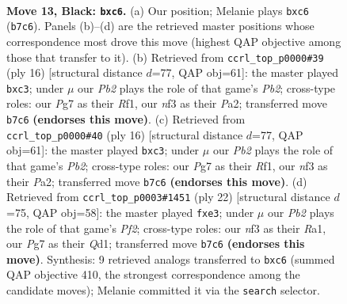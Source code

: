\documentclass[11pt]{article}
\begin{document}
\clearpage

\begin{figure}[p]\centering
\begin{subfigure}{0.46\textwidth}\centering
\resizebox{\linewidth}{!}{%
\newchessgame
\chessboard[
  setfen={r1bq1r2/bpp2ppk/2Bp1n1p/4p2P/P3P3/2PP1N2/5PP1/RNBQ1RK1 b - - 0 13},
  showmover=false,
  pgfstyle=straightmove, color=movearrow, markmove={b7-c6}
]}
\caption{}
\end{subfigure}\hfill
\begin{subfigure}{0.46\textwidth}\centering
\resizebox{\linewidth}{!}{%
\newchessgame
\chessboard[
  setfen={r1b1k2r/p1p1qppp/2pp1n2/4p3/4P3/2bP1N1P/PPP2PP1/R1BQ1RK1 w kq - 0 9},
  showmover=false,
  pgfstyle=straightmove, color=movearrow, markmove={b2-c3}
]}
\caption{}
\end{subfigure}
\\[4pt]
\begin{subfigure}{0.46\textwidth}\centering
\resizebox{\linewidth}{!}{%
\newchessgame
\chessboard[
  setfen={r1b1k2r/p1p1qppp/2pp1n2/4p3/4P3/2bP1N1P/PPP2PP1/R1BQ1RK1 w kq - 0 9},
  showmover=false,
  pgfstyle=straightmove, color=movearrow, markmove={b2-c3}
]}
\caption{}
\end{subfigure}\hfill
\begin{subfigure}{0.46\textwidth}\centering
\resizebox{\linewidth}{!}{%
\newchessgame
\chessboard[
  setfen={r2q1rk1/1pp2ppp/3p1n2/p3p3/P1B1P1b1/3PbN1P/1PP2PP1/R2Q1RK1 w - - 0 12},
  showmover=false,
  pgfstyle=straightmove, color=movearrow, markmove={f2-e3}
]}
\caption{}
\end{subfigure}
\caption{\textbf{Move 13, Black: \texttt{bxc6}.} (a) Our position; Melanie plays \texttt{bxc6} (\texttt{b7c6}). Panels (b)--(d) are the retrieved master positions whose correspondence most drove this move (highest QAP objective among those that transfer to it). (b) Retrieved from \texttt{ccrl\_top\_p0000\#39} (ply 16) [structural distance $d$=77, QAP obj=61]: the master played \texttt{bxc3}; under $\mu$ our \emph{Pb2} plays the role of that game's \emph{Pb2}; cross-type roles: our \emph{P}g7 as their \emph{R}f1, our \emph{n}f3 as their \emph{P}a2; transferred move \texttt{b7c6} \textbf{(endorses this move)}. (c) Retrieved from \texttt{ccrl\_top\_p0000\#40} (ply 16) [structural distance $d$=77, QAP obj=61]: the master played \texttt{bxc3}; under $\mu$ our \emph{Pb2} plays the role of that game's \emph{Pb2}; cross-type roles: our \emph{P}g7 as their \emph{R}f1, our \emph{n}f3 as their \emph{P}a2; transferred move \texttt{b7c6} \textbf{(endorses this move)}. (d) Retrieved from \texttt{ccrl\_top\_p0003\#1451} (ply 22) [structural distance $d$=75, QAP obj=58]: the master played \texttt{fxe3}; under $\mu$ our \emph{Pb2} plays the role of that game's \emph{Pf2}; cross-type roles: our \emph{n}f3 as their \emph{R}a1, our \emph{P}g7 as their \emph{Q}d1; transferred move \texttt{b7c6} \textbf{(endorses this move)}. Synthesis: 9 retrieved analogs transferred to \texttt{bxc6} (summed QAP objective 410, the strongest correspondence among the candidate moves); Melanie committed it via the \texttt{search} selector.}
\label{fig:thought-m25}
\end{figure}
\end{document}
